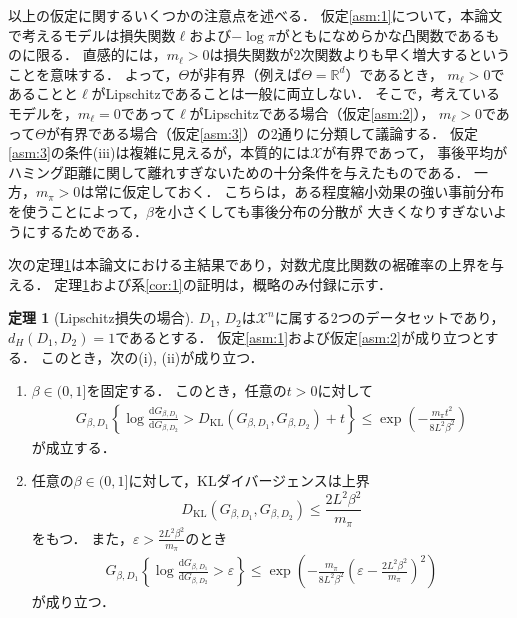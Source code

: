 \documentclass{jarticle}
\newcommand{\dd}{\mathrm{d}}
\theoremstyle{definition}
\newtheorem{thm}{定理}
\begin{document}
以上の仮定に関するいくつかの注意点を述べる．
仮定\ref{asm:1}について，本論文で考えるモデルは損失関数$\ell$および$-\log\pi$がともになめらかな凸関数であるものに限る．
直感的には，$m_\ell > 0$は損失関数が$2$次関数よりも早く増大するということを意味する．
よって，$\Theta$が非有界（例えば$\Theta=\mathbb{R}^d$）であるとき，
$m_\ell>0$であることと$\ell$がLipschitzであることは一般に両立しない．
そこで，考えているモデルを，$m_\ell=0$であって$\ell$がLipschitzである場合（仮定\ref{asm:2}），
$m_\ell>0$であって$\Theta$が有界である場合（仮定\ref{asm:3}）の$2$通りに分類して議論する．
仮定\ref{asm:3}の条件(iii)は複雑に見えるが，本質的には$\mathcal{X}$が有界であって，
事後平均がハミング距離に関して離れすぎないための十分条件を与えたものである．
一方，$m_\pi > 0$は常に仮定しておく．
こちらは，ある程度縮小効果の強い事前分布を使うことによって，$\beta$を小さくしても事後分布の分散が
大きくなりすぎないようにするためである．

次の定理\ref{thm:1}は本論文における主結果であり，対数尤度比関数の裾確率の上界を与える．
定理\ref{thm:1}および系\ref{cor:1}の証明は，概略のみ付録に示す．

\begin{thm}[Lipschitz損失の場合]
\label{thm:1}
$D_1$, $D_2$は$\mathcal{X}^n$に属する$2$つのデータセットであり，$d_H(D_1, D_2)=1$であるとする．
仮定\ref{asm:1}および仮定\ref{asm:2}が成り立つとする．
このとき，次の(i), (ii)が成り立つ．
\begin{enumerate}
\renewcommand{\labelenumi}{(\roman{enumi})}
\item $\beta \in (0, 1]$を固定する．
このとき，任意の$t>0$に対して
\begin{align}
G_{\beta, D_1} \left \{
\log \frac{\dd G_{\beta, D_1}}{\dd G_{\beta, D_2}} > D_{\mathrm{KL}}(G_{\beta, D_1}, G_{\beta, D_2}) + t
\right \}
\leq
\exp \left(
- \frac{m_\pi t^2}{8L^2\beta^2}
\right)
\label{eq:thm1_1}
\end{align} 
が成立する．

\item 任意の$\beta \in (0, 1]$に対して，KLダイバージェンスは上界
\begin{equation}
D_{\mathrm{KL}}(G_{\beta, D_1}, G_{\beta, D_2}) \leq \frac{2 L^2 \beta^2}{m_\pi}
\label{eq:thm1_2}
\end{equation}
をもつ．
また，$\varepsilon > \frac{2 L^2 \beta^2}{m_\pi}$のとき
\begin{align}
G_{\beta, D_1} \left \{
\log \frac{\dd G_{\beta, D_1}}{\dd G_{\beta, D_2}} > \varepsilon
\right \}
\leq
\exp \left(
- \frac{m_\pi}{8L^2\beta^2}
\left(
\varepsilon - \frac{2 L^2 \beta^2}{m_\pi}
\right)^2
\right)
\label{eq:thm1_3}
\end{align}
が成り立つ．
\end{enumerate}
\end{thm}
\end{document}
